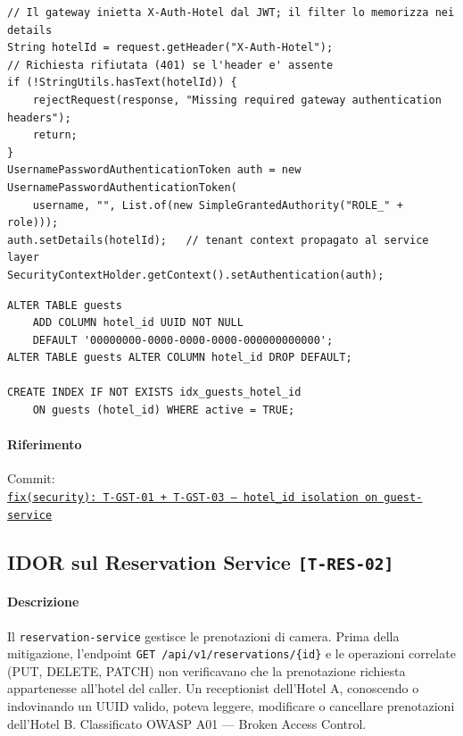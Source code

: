﻿\documentclass[a4paper,12pt]{report}
\newcommand{\commitref}[2]{\texttt{\small \href{https://github.com/diegoandruccioli/hotel-pms/commit/#1}{#2}}}
\newcommand{\threat}[1]{\texttt{\small\textcolor{vulnred}{[#1]}}}
\begin{document}
\begin{securebox}[title={InternalAuthFilter.java --- estrazione X-Auth-Hotel}]
\begin{lstlisting}[style=java]
// Il gateway inietta X-Auth-Hotel dal JWT; il filter lo memorizza nei details
String hotelId = request.getHeader("X-Auth-Hotel");
// Richiesta rifiutata (401) se l'header e' assente
if (!StringUtils.hasText(hotelId)) {
    rejectRequest(response, "Missing required gateway authentication headers");
    return;
}
UsernamePasswordAuthenticationToken auth = new UsernamePasswordAuthenticationToken(
    username, "", List.of(new SimpleGrantedAuthority("ROLE_" + role)));
auth.setDetails(hotelId);   // tenant context propagato al service layer
SecurityContextHolder.getContext().setAuthentication(auth);
\end{lstlisting}
\end{securebox}

\begin{securebox}[title={V2\_\_add\_hotel\_id\_to\_guests.sql --- Flyway migration}]
\begin{lstlisting}[style=sql]
ALTER TABLE guests
    ADD COLUMN hotel_id UUID NOT NULL
    DEFAULT '00000000-0000-0000-0000-000000000000';
ALTER TABLE guests ALTER COLUMN hotel_id DROP DEFAULT;

CREATE INDEX IF NOT EXISTS idx_guests_hotel_id
    ON guests (hotel_id) WHERE active = TRUE;
\end{lstlisting}
\end{securebox}

\paragraph{Riferimento} Commit:\\
\commitref{b483eac}{fix(security): T-GST-01 + T-GST-03 --- hotel\_id isolation on guest-service}

\subsection{IDOR sul Reservation Service \threat{T-RES-02}}

\paragraph{Descrizione}
Il \texttt{reservation-service} gestisce le prenotazioni di camera. Prima della
mitigazione, l'endpoint \texttt{GET /api/v1/reservations/\{id\}} e le operazioni
correlate (PUT, DELETE, PATCH) non verificavano che la prenotazione richiesta
appartenesse all'hotel del caller. Un receptionist dell'Hotel A, conoscendo o
indovinando un UUID valido, poteva leggere, modificare o cancellare prenotazioni
dell'Hotel B. Classificato OWASP A01 --- Broken Access Control.
\end{document}
